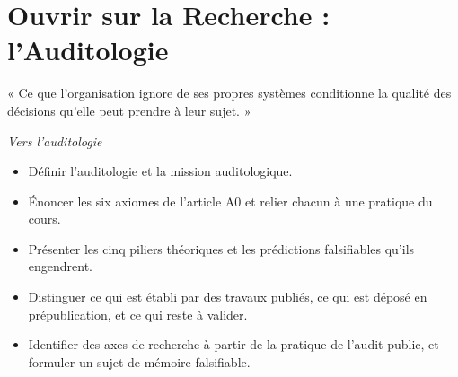 
\chapter[Ouvrir sur la recherche : l'auditologie]{Ouvrir sur la Recherche : l'Auditologie}
\label{chap:recherche}

\epigraph{%
    « Ce que l'organisation ignore de ses propres systèmes conditionne la
    qualité des décisions qu'elle peut prendre à leur sujet. »%
}{\textit{Vers l'auditologie}~\cite{minka2026auditologie}}


\begin{boxobjectifs}
\begin{itemize}
    \item Définir l'auditologie et la mission auditologique.
    \item Énoncer les six axiomes de l'article A0 et relier chacun à une
          pratique du cours.
    \item Présenter les cinq piliers théoriques et les prédictions
          falsifiables qu'ils engendrent.
    \item Distinguer ce qui est établi par des travaux publiés, ce qui est
          déposé en prépublication, et ce qui reste à valider.
    \item Identifier des axes de recherche à partir de la pratique de
          l'audit public, et formuler un sujet de mémoire falsifiable.
\end{itemize}
\end{boxobjectifs}

